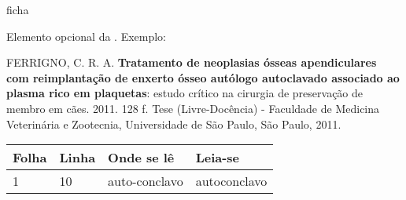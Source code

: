\frenchspacing                %

\imprimircapa
\imprimirfolhaderosto*    %

{ficha}

\begin{errata}
Elemento opcional da . Exemplo:

\vspace{\onelineskip}

FERRIGNO, C. R. A. \textbf{Tratamento de neoplasias ósseas apendiculares com
  reimplantação de enxerto ósseo autólogo autoclavado associado ao plasma
  rico em plaquetas}: estudo crítico na cirurgia de preservação de membro em
cães. 2011. 128 f. Tese (Livre-Docência) - Faculdade de Medicina Veterinária e
Zootecnia, Universidade de São Paulo, São Paulo, 2011.

\begin{table}[htb]
  \center
  \footnotesize
  \begin{tabular}{|p{1.4cm}|p{1cm}|p{3cm}|p{3cm}|}
    \hline
    \textbf{Folha} & \textbf{Linha} & \textbf{Onde se lê} & \textbf{Leia-se} \\
    \hline
    1              & 10             & auto-conclavo       & autoconclavo     \\
    \hline
  \end{tabular}
\end{table}

\end{errata}


